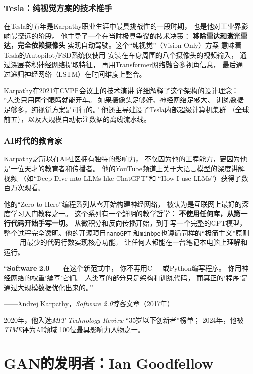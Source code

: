 \subsubsection{Tesla：纯视觉方案的技术推手}
在Tesla的五年是Karpathy职业生涯中最具挑战性的一段时期，
也是他对工业界影响最深远的阶段。
他主导了一个在当时极具争议的技术决策：
\textbf{移除雷达和激光雷达，完全依赖摄像头}
实现自动驾驶。这个``纯视觉''（Vision-Only）方案
意味着Tesla的Autopilot/FSD系统仅使用
安装在车身周围的八个摄像头的视频输入，
通过深层卷积神经网络提取特征，
再用Transformer网络融合多视角信息，
最后通过递归神经网络（LSTM）在时间维度上整合。

Karpathy在2021年CVPR会议上的技术演讲
详细解释了这个架构的设计理念：
``人类只用两个眼睛就能开车。
如果摄像头足够好、神经网络足够大、
训练数据足够多，纯视觉方案是可行的。''
他还主导建设了Tesla内部超级计算机集群
（全球前五），以及大规模自动标注数据的离线流水线。

\subsubsection{AI时代的教育家}
Karpathy之所以在AI社区拥有独特的影响力，
不仅因为他的工程能力，更因为他是一位天才的教育者和传播者。
他的YouTube频道上关于大语言模型的深度讲解视频
（如``Deep Dive into LLMs like ChatGPT''和
``How I use LLMs''）获得了数百万次观看。

他的``Zero to Hero''编程系列从零开始构建神经网络，
被认为是互联网上最好的深度学习入门教程之一。
这个系列有一个鲜明的教学哲学：
\textbf{不使用任何库，从第一行代码开始手写一切}。
从微积分和反向传播开始，到手写一个完整的GPT模型，
整个过程完全透明。他的开源项目\texttt{nanoGPT}
和\texttt{minbpe}也遵循同样的``极简主义''原则——
用最少的代码行数实现核心功能，
让任何人都能在一台笔记本电脑上理解和运行。

\begin{keybox}
``\textbf{Software 2.0}——在这个新范式中，
你不再用C++或Python编写程序。
你用神经网络的权重`编写'它们。
人类写的部分只是架构和训练代码，
而真正的`程序'是通过大规模数据优化出来的。''

——Andrej Karpathy，\textit{Software 2.0}博客文章（2017年）
\end{keybox}

2020年，他入选\textit{MIT Technology Review}
``35岁以下创新者''榜单；
2024年，他被\textit{TIME}评为AI领域
100位最具影响力人物之一。


\section{GAN的发明者：Ian Goodfellow}
\label{sec:goodfellow}

